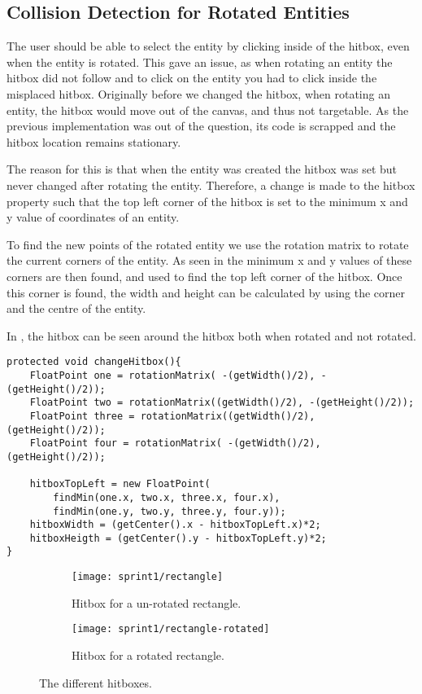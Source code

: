 \subsection{Collision Detection for Rotated Entities}
The user should be able to select the entity by clicking inside of the hitbox, even when the entity is rotated.
This gave an issue, as when rotating an entity the hitbox did not follow and to click on the entity you had to click inside the misplaced hitbox. 
Originally before we changed the hitbox, when rotating an entity, the hitbox would move out of the canvas, and thus not targetable. As the previous implementation was out of the question, its code is scrapped and the hitbox location remains stationary.

The reason for this is that when the entity was created the hitbox was set but never changed after rotating the entity.
Therefore, a change is made to the hitbox property such that the top left corner of the hitbox is set to the minimum x and y value of coordinates of an entity.

To find the new points of the rotated entity we use the rotation matrix to rotate the current corners of the entity.
As seen in  the minimum x and y values of these corners are then found, and used to find the top left corner of the hitbox.
Once this corner is found, the width and height can be calculated by using the corner and the centre of the entity.

In , the hitbox can be seen around the hitbox both when rotated and not rotated.

\begin{lstlisting}[caption={Method to change the hitbox},label=lst:changeHitbox]
protected void changeHitbox(){
	FloatPoint one = rotationMatrix( -(getWidth()/2), -(getHeight()/2));
	FloatPoint two = rotationMatrix((getWidth()/2), -(getHeight()/2));
	FloatPoint three = rotationMatrix((getWidth()/2), (getHeight()/2));
	FloatPoint four = rotationMatrix( -(getWidth()/2), (getHeight()/2));
	
	hitboxTopLeft = new FloatPoint(
	    findMin(one.x, two.x, three.x, four.x),
	    findMin(one.y, two.y, three.y, four.y));
	hitboxWidth = (getCenter().x - hitboxTopLeft.x)*2;
	hitboxHeigth = (getCenter().y - hitboxTopLeft.y)*2;
}
\end{lstlisting}



\begin{figure}[h]
	\centering
	\begin{subfigure}[b]{0.45\textwidth}
		\centering
		\texttt{[image: sprint1/rectangle]}
		\caption{Hitbox for a un-rotated rectangle.}
		\label{figure:hitbox-rectangle}
	\end{subfigure}
	\qquad
	\begin{subfigure}[b]{0.45\textwidth}
		\centering
		\texttt{[image: sprint1/rectangle-rotated]}
		\caption{Hitbox for a rotated rectangle.}
		\label{figure:hitbox-rotated-rectangle}
	\end{subfigure}
	\caption{The different hitboxes.}
	\label{figure:hitbox}
\end{figure}

